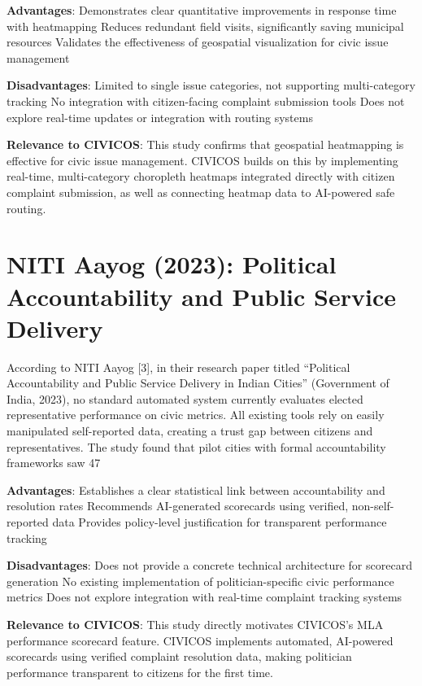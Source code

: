 \documentclass[12pt,a4paper]{report}
\begin{document}
\textbf{Advantages}:
Demonstrates clear quantitative improvements in response time with heatmapping
Reduces redundant field visits, significantly saving municipal resources
Validates the effectiveness of geospatial visualization for civic issue management

\textbf{Disadvantages}:
Limited to single issue categories, not supporting multi-category tracking
No integration with citizen-facing complaint submission tools
Does not explore real-time updates or integration with routing systems

\textbf{Relevance to CIVICOS}: This study confirms that geospatial heatmapping is effective for civic issue management. CIVICOS builds on this by implementing real-time, multi-category choropleth heatmaps integrated directly with citizen complaint submission, as well as connecting heatmap data to AI-powered safe routing.

\section{NITI Aayog (2023): Political Accountability and Public Service Delivery}

According to NITI Aayog [3], in their research paper titled “Political Accountability and Public Service Delivery in Indian Cities” (Government of India, 2023), no standard automated system currently evaluates elected representative performance on civic metrics. All existing tools rely on easily manipulated self-reported data, creating a trust gap between citizens and representatives. The study found that pilot cities with formal accountability frameworks saw 47%

\textbf{Advantages}:
Establishes a clear statistical link between accountability and resolution rates
Recommends AI-generated scorecards using verified, non-self-reported data
Provides policy-level justification for transparent performance tracking

\textbf{Disadvantages}:
Does not provide a concrete technical architecture for scorecard generation
No existing implementation of politician-specific civic performance metrics
Does not explore integration with real-time complaint tracking systems

\textbf{Relevance to CIVICOS}: This study directly motivates CIVICOS’s MLA performance scorecard feature. CIVICOS implements automated, AI-powered scorecards using verified complaint resolution data, making politician performance transparent to citizens for the first time.
\end{document}
